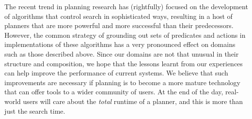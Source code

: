 
The recent trend in planning research has (rightfully) focused on the
development of algorithms that control search in sophisticated ways,
resulting in a host of planners that are more powerful and more
successful than their predecessors. However, the common strategy of
grounding out sets of predicates and actions in implementations of
these algorithms has a very pronounced effect on domains such as those
described above. Since our domains are not that unusual in their
structure and composition, we hope that the lessons learnt from our
experiences can help improve the performance of current systems. We
believe that such improvements are necessary if planning is to become
a more mature technology that can offer tools to a wider community of
users. At the end of the day, real-world users will care about the
\emph{total} runtime of a planner, and this is more than just the
search time.


